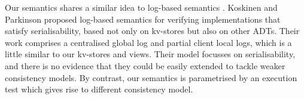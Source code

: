 Our semantics shares a similar idea to log-based semantics \cite{push-pull,log-based-op}.
Koskinen and Parkinson
\citet{push-pull}  proposed log-based semantics for 
verifying implementations that satisfy serialisability, based not
only on kv-stores
but  also on other ADTs. Their work comprises a centralised global log 
and partial client local logs, which is a little similar to 
our kv-stores and views. Their model focusses on serialisability, and 
there is no evidence that they could be easily extended to tackle
weaker consistency models.
By contrast, our semantics is parametrised by an execution test which gives rise to 
different consistency model.
